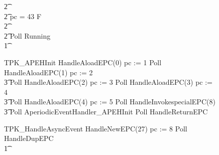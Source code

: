 \begin{figure}[p!]
\begin{circus}
    \t2 {} \cdots {} \\
    \t2 {} \circelse pc = 43 \circthen F \\
    \t2 {} \cdots {} \\
    \t2 \circfi \circseq Poll \circseq Running \\
    \t1 \circfi
  \end{circus}
  \vspace{-1cm}
  \begin{circus}
    TPK\_APEHInit \circdef HandleAloadEPC(0) \circseq pc := 1 \circseq Poll \circseq HandleAloadEPC(1) \circseq pc := 2 \circseq \\
    \t3 Poll \circseq HandleAloadEPC(2) \circseq pc := 3 \circseq Poll \circseq HandleAloadEPC(3) \circseq pc := 4 \circseq \\
    \t3 Poll \circseq HandleAloadEPC(4) \circseq pc := 5 \circseq Poll \circseq HandleInvokespecialEPC(8) \circseq \\
    \t3 Poll \circseq AperiodicEventHandler\_APEHInit \circseq Poll \circseq HandleReturnEPC \\
  \end{circus}
  \vspace{-1.5cm}
  \begin{circus}
    TPK\_HandleAsyncEvent \circdef HandleNewEPC(27) \circseq pc := 8 \circseq Poll \circseq HandleDupEPC \circseq \\
    \t1 {} \cdots {} \\

\end{circus}
\end{figure}

